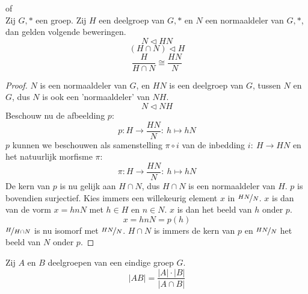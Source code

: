 \documentclass[main.tex]{subfiles}
\begin{document}
\begin{st}
   of \\
  Zij $G,*$ een groep. Zij $H$ een deelgroep van $G,*$ en $N$ een normaaldeler van $G,*$, dan gelden volgende beweringen.
  \[ N \triangleleft HN \]
  \[ (H \cap N) \triangleleft H \]
  \[ \frac{H}{H\cap N} \cong \frac{HN}{N} \]

  \begin{proof}
    $N$ is een normaaldeler van $G$, en $HN$ is een deelgroep van $G$, tussen $N$ en $G$, dus $N$ is ook een 'normaaldeler' van $NH$.
    \[ N \triangleleft NH \]
    Beschouw nu de afbeelding $p$:
    \[ p: H \rightarrow \frac{HN}{N}:\ h \mapsto hN \]
    $p$ kunnen we beschouwen als samenstelling $\pi \circ i$ van de inbedding $i:\ H\rightarrow HN$ en het natuurlijk morfisme $\pi$:
    \[ \pi: H \rightarrow \frac{HN}{N}:\ h \mapsto hN \]
    De kern van $p$ is nu gelijk aan $H\cap N$, dus $H \cap N$ is een normaaldeler van $H$.
    $p$ is bovendien surjectief.
    Kies immers een willekeurig element $x$ in $\nicefrac{HN}{N}$.
    $x$ is dan van de vorm $x=hnN$ met $h\in H$ en $n\in N$.
    $x$ is dan het beeld van $h$ onder $p$.
    \[ x = hnN = p(h) \]
    $\nicefrac{H}{H\cap N}$ is nu isomorf met $\nicefrac{HN}{N}$.
    $H\cap N$ is immers de kern van $p$ en $\nicefrac{HN}{N}$ het beeld van $N$ onder $p$.
  \end{proof}
\end{st}

\begin{st}
  Zij $A$ en $B$ deelgroepen van een eindige groep $G$.
  \[ |AB| = \frac{|A|\cdot|B|}{|A\cap B|} \]
\end{st}
\end{document}
